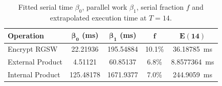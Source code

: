 
\begin{table}[H]
    \caption{Fitted serial time $\beta_0$, parallel work $\beta_1$, serial fraction $f$ and extrapolated execution time at $T = 14$.}
    \label{tab:bench:amdahl}
    \centering
    \begin{tabular}{lcccc}
        \toprule
        \textbf{Operation} & $\mathbf{\beta_0}$ \textbf{(ms)} & $\mathbf{\beta_1}$ \textbf{(ms)} & $\mathbf{f}$ & $\mathbf{E(14)}$ \\
        \midrule
        Encrypt RGSW     & \num{22.21936} & \num{195.54884} & 10.1\% & \num{36.18785}~ms \\
        External Product & \num{4.51121}  & \num{60.85137}  & 6.8\% & \num{8.8577364}~ms \\
        Internal Product & \num{125.48178} & \num{1671.9377} & 7.0\% & \num{244.9059}~ms \\
        \bottomrule
    \end{tabular}
\end{table}

            


